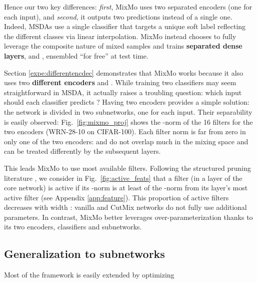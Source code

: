 \documentclass[10pt,twocolumn,letterpaper]{article}
\begin{document}
Hence our two key differences: \textit{first}, MixMo uses two separated encoders (one for each input), and \textit{second}, it outputs two predictions instead of a single one. Indeed, MSDAs use a single classifier that targets a unique soft label reflecting the different classes via linear interpolation. MixMo instead chooses to fully leverage the composite nature of mixed samples and trains
\textbf{separated dense layers},  and , ensembled ``for free'' at test
time.

Section \ref{expe:differentencdec} demonstrates that MixMo works because it also
uses two \textbf{different encoders}  and .
While training two classifiers may seem straightforward in MSDA, it actually
raises a troubling question: which input should each classifier predicts ?
Having two encoders provides a simple solution: the network is divided in two subnetworks, one for each input. Their separability is easily observed:
Fig.~\ref{fig:mixmo_proj} shows the -norm of the 16 filters
for the two encoders (WRN-28-10 on CIFAR-100). Each filter norm is far from
zero in only one of the two encoders:  and  do not
overlap much in the mixing space and can be treated differently by the
subsequent layers.

This leads MixMo to use most available filters. Following the
structured pruning literature \cite{li2017pruning}, we consider in
Fig.~\ref{fig:active_feats} that a filter (in a layer of the core network) is
active if its -norm is at least  of the -norm from its layer's
most active filter (see Appendix \ref{app:feature}). This proportion of active
filters decreases with width : vanilla and CutMix networks do not fully use
additional parameters. In contrast, MixMo better leverages over-parameterization
thanks to its two encoders, classifiers and subnetworks.

\subsection{Generalization to  subnetworks}\label{model:mheads}Most of the framework is easily extended by optimizing \linebreak 
\end{document}
